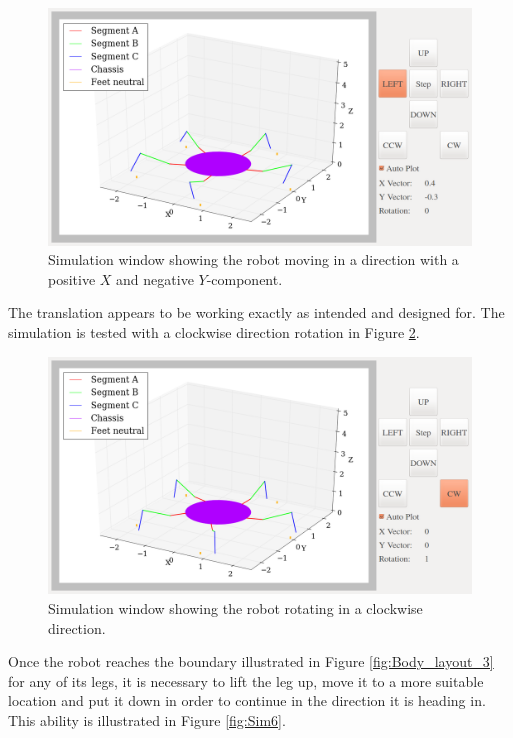 \begin{figure}[H]
\centering
\includegraphics[scale = 0.33]{pics/Sim4.png}
\caption{Simulation window showing the robot moving in a direction with a positive $X$ and negative $Y$-component.}
\label{fig:Sim4}
\end{figure}

The translation appears to be working exactly as intended and designed for. The simulation is tested with a clockwise direction rotation in Figure \ref{fig:Sim5}.

\begin{figure}[H]
\centering
\includegraphics[scale = 0.33]{pics/Sim5.png}
\caption{Simulation window showing the robot rotating in a clockwise direction.}
\label{fig:Sim5}
\end{figure}

Once the robot reaches the boundary illustrated in Figure \ref{fig:Body_layout_3} for any of its legs, it is necessary to lift the leg up, move it to a more suitable location and put it down in order to continue in the direction it is heading in. This ability is illustrated in Figure \ref{fig:Sim6}.

